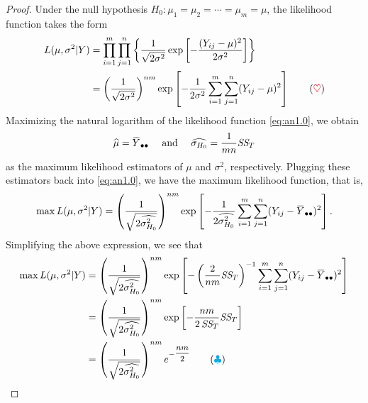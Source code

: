 \begin{proof}
    Under the null hypothesis $H_0 : \mu_1 = \mu_2 = \cdots = \mu_m = \mu$, the likelihood function 
    takes the form 
    \begin{align*}
        L(\mu, \sigma^2 | Y) &= \prod^m_{i=1} \prod^n_{j=1} \left\{ \frac{1}{\sqrt{2\sigma^2}}
        \exp \left[ - \frac{(Y_{ij} - \mu)^2 }{2\sigma^2}\right] \right\}\\
        &= \left( \frac{1}{ \sqrt{2\sigma^2}} \right)^{nm} \exp \left[ - \frac{1}{2\sigma^2} \sum^{m}_{i=1} \sum^n_{j=1} (Y_{ij} - \mu)^2\right]
        \label{eq:an1.0} \tag{{\color{red} $\heartsuit $}}
    \end{align*}
    Maximizing the natural logarithm of the likelihood function \eqref{eq:an1.0}, we obtain 
    \[
        \widehat{\mu} = \ols{Y}_{\bullet \bullet} \quad \text{ and }
        \quad 
        \widehat{\sigma_{H_0}} = \frac{1}{mn} \CS{T}
    \]
    as the maximum likelihood estimators of $\mu$ and $\sigma^2$, respectively. Plugging these 
    estimators back into \eqref{eq:an1.0}, we have the maximum likelihood function, that is,
    \[
        \max L(\mu, \sigma^2 | Y) = \left( \frac{1}{ \sqrt{2\widehat{\sigma^2_{H_0}}}} \right)^{nm} \exp \left[ - \frac{1}{2\widehat{\sigma^2_{H_0}}} \sum^{m}_{i=1} \sum^n_{j=1} (Y_{ij} - \ols{Y}_{\bullet \bullet})^2\right].
    \]
    Simplifying the above expression, we see that 
    \begin{align*}
        \max L(\mu, \sigma^2 | Y) &= \left( \frac{1}{ \sqrt{2\widehat{\sigma^2_{H_0}}}} \right)^{nm} \exp \left[ - \left(\frac{2}{nm} \CS{T} \right)^{-1} \sum^{m}_{i=1} \sum^n_{j=1} (Y_{ij} - \ols{Y}_{\bullet \bullet})^2\right]\\
        &= \left( \frac{1}{ \sqrt{2\widehat{\sigma^2_{H_0}}}} \right)^{nm} \exp \left[ - \frac{nm}{2 \, \CS{T}} \CS{T} \right]\\
        &=  \left( \frac{1}{ \sqrt{2\widehat{\sigma^2_{H_0}}}} \right)^{nm} e^{-\mfrac{nm}{2}}  \label{eq:an1.1} \tag{{\color{cyan} $\clubsuit $}}
    \end{align*}


\end{proof}
